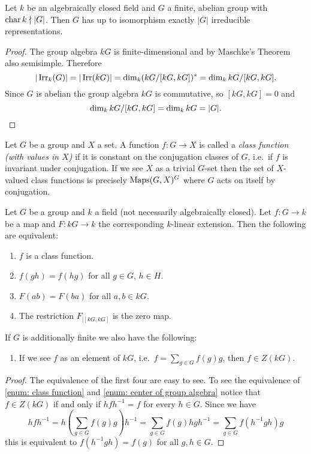 \begin{cor}\label{cor: number of irreducible representations of finite abelian group}
  Let $k$ be an algebraically closed field and $G$ a finite, abelian group with $\operatorname{char} k \nmid |G|$.
  Then $G$ has up to isomorphism exactly $|G|$ irreducible representations.
\end{cor}
\begin{proof}
  The group algebra $kG$ is finite-dimensional and by Maschke’s Theorem also semisimple.
  Therefore
  \[
      |\operatorname{Irr}_k(G)|
    = |\operatorname{Irr}(kG)|
    = \dim_k (kG/[kG, kG])^*
    = \dim_k kG/[kG, kG].
  \]
  Since $G$ is abelian the group algebra $kG$ is commutative, so $[kG,kG] = 0$ and
  \[
      \dim_k kG/[kG, kG]
    = \dim_k kG
    = |G|.
    \qedhere
  \]
\end{proof}


\begin{defi}
  Let $G$ be a group and $X$ a set.
  A function $f \colon G \to X$ is called a \emph{class function (with values in $X$)} if it is constant on the conjugation classes of $G$, i.e.\ if $f$ is invariant under conjugation.
  If we see $X$ as a trivial $G$-set then the set of $X$-valued class functions is precisely $\operatorname{Maps}(G,X)^G$ where $G$ acts on itself by conjugation.
\end{defi}


\begin{lem} \label{lem: characterisation class functions}
  Let $G$ be a group and $k$ a field (not necessarily algebraically closed).
  Let $f \colon G \to k$ be a map and $F \colon kG \to k$ the corresponding $k$-linear extension.
  Then the following are equivalent:
  \begin{enumerate}[label=\emph{\roman*)}, leftmargin=*]
    \item \label{enum: class function}
      $f$ is a class function.
    \item
      $f(gh) = f(hg)$ for all $g \in G$, $h \in H$.
    \item
      $F(ab) = F(ba)$ for all $a, b \in kG$.
    \item
      The restriction $F_{|[kG,kG]}$ is the zero map.
  \end{enumerate}
  If $G$ is additionally finite we also have the following:
  \begin{enumerate}[label=\emph{\roman*)}, leftmargin=*, resume]
    \item \label{enum: center of group algebra}
      If we see $f$ as an element of $kG$, i.e.\ $f = \sum_{g \in G} f(g) g$, then $f \in Z(kG)$.
  \end{enumerate}
\end{lem}
\begin{proof}
  The equivalence of the first four are easy to see.
  To see the equivalence of \ref{enum: class function} and \ref{enum: center of group algebra} notice that $f \in Z(kG)$ if and only if $hfh^{-1} = f$ for every $h \in G$.
  Since we have
    \[
        h f h^{-1}
      = h\left( \sum_{g \in G} f(g) g \right) h^{-1}
      = \sum_{g \in G} f(g) hgh^{-1}
      = \sum_{g \in G} f(h^{-1} g h) g
    \]
    this is equivalent to $f(h^{-1} g h) = f(g)$ for all $g, h \in G$.
\end{proof}


